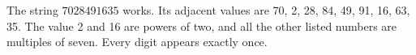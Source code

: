 The string $\boxed{7028491635}$ works. Its adjacent values are 70, 2, 28, 84, 49, 91, 16, 63, 35. The value 2 and 16 are powers of two, and all the other listed numbers are multiples of seven. Every digit appears exactly once.
